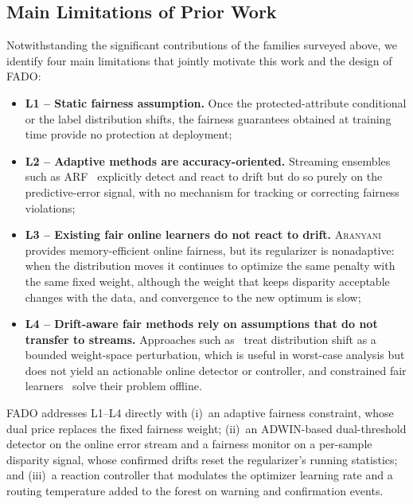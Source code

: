 \documentclass[conference]{IEEEtran}
\newcommand{\fado}{\textsc{FADO}}
\newcommand{\ara}{\textsc{Aranyani}}
\newcommand{\arf}{\textsc{ARF}}
\begin{document}
\subsection{Main Limitations of Prior Work}
\label{sec:related:limitations}
Notwithstanding the significant contributions of the families surveyed above, we identify four main limitations that jointly motivate this work and the design
of \fado{}:
\begin{itemize}
\item \textbf{L1 -- Static fairness assumption.} Once the protected-attribute conditional or the label distribution shifts, the fairness guarantees obtained at
training time provide no protection at deployment;
\item \textbf{L2 -- Adaptive methods are accuracy-oriented.} Streaming ensembles such as \arf{}~\cite{10.1007/s10994-017-5642-8} explicitly detect and react to drift
but do so purely on the predictive-error signal, with no mechanism for tracking or correcting fairness violations;
\item \textbf{L3 -- Existing fair online learners do not react to drift.} \ara{}~\cite{chowdhury2024enhancing} provides memory-efficient online fairness, but its
regularizer is nonadaptive: when the distribution moves it continues to optimize the same penalty with the same fixed weight, although the weight that keeps
disparity acceptable changes with the data, and convergence to the new optimum is slow;
\item \textbf{L4 -- Drift-aware fair methods rely on assumptions that do not transfer to streams.} Approaches such
as~\cite{jiang2023chasingfairnessdistributionshift} treat distribution shift as a bounded weight-space perturbation, which is useful in worst-case analysis but
does not yield an actionable online detector or controller, and constrained fair learners~\cite{zafar2017fairnessconstraintsmechanismsfair,cotter2018optimizationnondifferentiableconstraintsapplications,agarwal2018reductionsapproachfairclassification}
solve their problem offline.
\end{itemize}
\fado{} addresses L1--L4 directly with (i)~an
adaptive fairness constraint, whose dual price replaces the fixed fairness weight; (ii)~an ADWIN-based dual-threshold detector on the online error stream and a
fairness monitor on a per-sample disparity signal, whose confirmed drifts reset the regularizer's running statistics; and (iii)~a reaction controller that
modulates the optimizer learning rate and a routing temperature added to the forest on warning and confirmation events.
\end{document}
